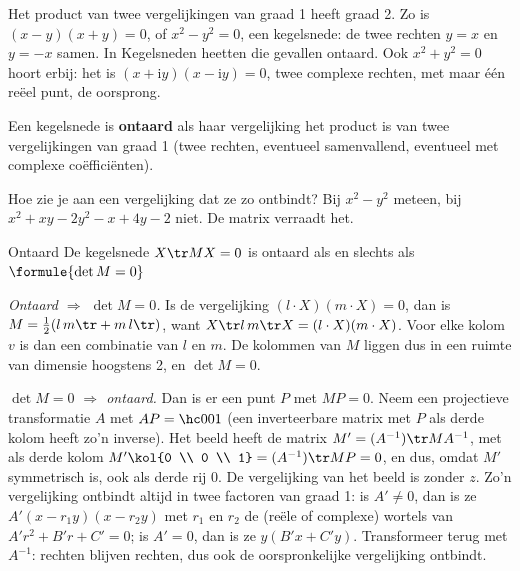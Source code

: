 Het product van twee vergelijkingen van graad 1 heeft graad 2. Zo is $(x - y)(x + y) = 0$, of $x^2 - y^2 = 0$, een kegelsnede: de twee rechten $y = x$ en $y = -x$ samen. In Kegelsneden heetten die gevallen ontaard. Ook $x^2 + y^2 = 0$ hoort erbij: het is $(x + \mathrm{i}y)(x - \mathrm{i}y) = 0$, twee complexe rechten, met maar één reëel punt, de oorsprong.

\begin{theorie}
Een kegelsnede is \textbf{\textcolor{accent}{ontaard}} als haar vergelijking het product is van twee vergelijkingen van graad 1 (twee rechten, eventueel samenvallend, eventueel met complexe coëfficiënten).
\end{theorie}

Hoe zie je aan een vergelijking dat ze zo ontbindt? Bij $x^2 - y^2$ meteen, bij $x^2 + xy - 2y^2 - x + 4y - 2$ niet. De matrix verraadt het.

\begin{theorie}
\begin{stelling}{Ontaard}
De kegelsnede $X\tr MX = 0$ is ontaard als en slechts als \qquad $\formule{\det M = 0}$
\end{stelling}

\begin{bewijs}
\textit{Ontaard $\Rightarrow$ $\det M = 0$.} Is de vergelijking $(l \cdot X)(m \cdot X) = 0$, dan is $M = \tfrac12(l\,m\tr + m\,l\tr)$, want $X\tr l\,m\tr X = (l \cdot X)(m \cdot X)$. Voor elke kolom $v$ is dan
een combinatie van $l$ en $m$. De kolommen van $M$ liggen dus in een ruimte van dimensie hoogstens 2, en $\det M = 0$.

\textit{$\det M = 0$ $\Rightarrow$ ontaard.} Dan is er een punt $P$ met $MP = 0$. Neem een projectieve transformatie $A$ met $AP = \hc001$ (een inverteerbare matrix met $P$ als derde kolom heeft zo'n inverse). Het beeld heeft de matrix $M' = (A^{-1})\tr MA^{-1}$, met als derde kolom $M'\kol{0 \\ 0 \\ 1} = (A^{-1})\tr MP = 0$, en dus, omdat $M'$ symmetrisch is, ook als derde rij 0. De vergelijking van het beeld is
zonder $z$. Zo'n vergelijking ontbindt altijd in twee factoren van graad 1: is $A' \neq 0$, dan is ze $A'(x - r_1y)(x - r_2y)$ met $r_1$ en $r_2$ de (reële of complexe) wortels van $A'r^2 + B'r + C' = 0$; is $A' = 0$, dan is ze $y(B'x + C'y)$. Transformeer terug met $A^{-1}$: rechten blijven rechten, dus ook de oorspronkelijke vergelijking ontbindt.
\end{bewijs}
\end{theorie}

